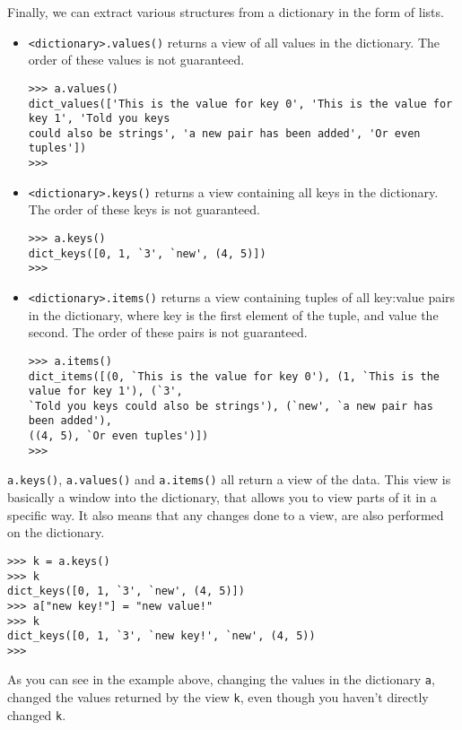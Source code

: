 Finally, we can extract various structures from a dictionary in the   form of lists.
\lstset{keywordstyle=\ttfamily}
\begin{itemize}
	\item 
\texttt{<dictionary>.values()} returns a view of      all values in the dictionary. The order of these     values is not guaranteed.      
\begin{lstlisting}
>>> a.values()
dict_values(['This is the value for key 0', 'This is the value for key 1', 'Told you keys
could also be strings', 'a new pair has been added', 'Or even tuples'])
>>>
\end{lstlisting}
	\item 
\texttt{<dictionary>.keys()} returns a view     containing all keys in the dictionary. The order of these keys     is not guaranteed.      
\begin{lstlisting}
>>> a.keys()
dict_keys([0, 1, `3', `new', (4, 5)])
>>>
\end{lstlisting}
	\item 
\texttt{<dictionary>.items()} returns a view     containing tuples of all key:value pairs in the dictionary,     where key is the first element of the tuple, and value the     second. The order of these pairs is not guaranteed.      
\begin{lstlisting}
>>> a.items()
dict_items([(0, `This is the value for key 0'), (1, `This is the value for key 1'), (`3',
`Told you keys could also be strings'), (`new', `a new pair has been added'),
((4, 5), `Or even tuples')])
>>>
\end{lstlisting}
\end{itemize}
\lstset{keywordstyle=\textbf}

\texttt{a.keys()}, \texttt{a.values()} and \texttt{a.items()} all return a view of the data. This view is basically a window into the dictionary, that allows you to view parts of it in a specific way. It also means that any changes done to a view, are also performed on the dictionary.
\begin{lstlisting}       
>>> k = a.keys()       
>>> k       
dict_keys([0, 1, `3', `new', (4, 5)])       
>>> a["new key!"] = "new value!"       
>>> k       
dict_keys([0, 1, `3', `new key!', `new', (4, 5))  
>>>   
\end{lstlisting}

As you can see in the example above, changing the values in the dictionary \texttt{a}, changed the values returned by the view \texttt{k}, even though you haven't directly changed \texttt{k}. 

